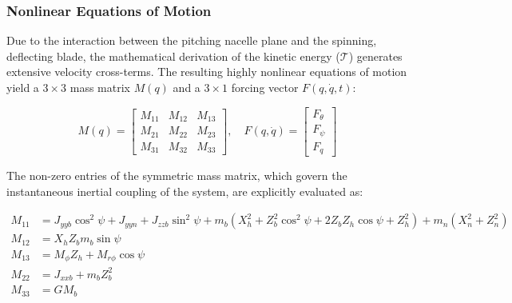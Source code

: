 \documentclass[final,onecolumn]{IEEEtran}
\begin{document}
\subsubsection{Nonlinear Equations of Motion}
\label{sec:model2_nonlinear_eom}
Due to the interaction between the pitching nacelle plane and the spinning, deflecting blade, the mathematical derivation of the kinetic energy ($\mathcal{T}$) generates extensive velocity cross-terms. The resulting highly nonlinear equations of motion yield a $3 \times 3$ mass matrix $M(q)$ and a $3 \times 1$ forcing vector $F(q, \dot{q}, t)$:

\begin{equation}
    M(q) = \begin{bmatrix} M_{11} & M_{12} & M_{13} \\ M_{21} & M_{22} & M_{23} \\ M_{31} & M_{32} & M_{33} \end{bmatrix}, \quad
    F(q, \dot{q}) = \begin{bmatrix} F_{\theta} \\ F_{\psi} \\ F_{q} \end{bmatrix}
    \label{eq:model2_M_F_nonlinear}
\end{equation}

The non-zero entries of the symmetric mass matrix, which govern the instantaneous inertial coupling of the system, are explicitly evaluated as:

\begin{align*}
    M_{11} & = J_{yyb} \cos^{2}{\psi} + J_{yyn} + J_{zzb} \sin^{2}{\psi} + m_{b} \left(X_{h}^{2} + Z_{b}^{2} \cos^{2}{\psi} + 2 Z_{b} Z_{h} \cos{\psi} + Z_{h}^{2}\right) + m_{n} \left(X_{n}^{2} + Z_{n}^{2}\right) \\
    M_{12} & = X_{h} Z_{b} m_{b} \sin{\psi}                                                                                                                                                                          \\
    M_{13} & = M_{\phi} Z_{h} + M_{r\phi} \cos{\psi}                                                                                                                                                                 \\
    M_{22} & = J_{xxb} + m_{b} Z_{b}^{2}                                                                                                                                                                             \\
    M_{33} & = GM_{b}
\end{align*}
\end{document}
